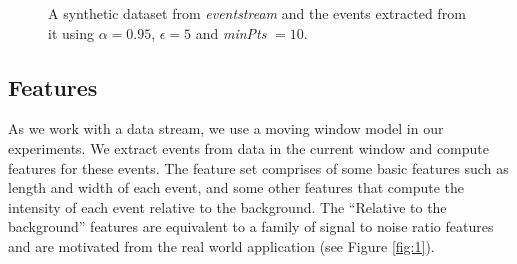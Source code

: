 \documentclass[11pt]{article}
\begin{document}
	 \begin{figure}[H]
	 	\centering
	 	\caption{\footnotesize A synthetic dataset from {\it eventstream} and the events extracted from it using $\alpha=0.95$, $\epsilon = 5$ and {\it minPts} $= 10$.} 
	 	\label{fig:blobs_A_B}
	 \end{figure}
	 
	 \subsection{Features}\label{sec:Featurelist}
	 As we work with a data stream, we use a moving window model in our experiments. We extract events from data in the current window and compute features for these events. The feature set comprises of some basic features such as length and width of each event, and some other features that compute the intensity of each event relative to the background.  The  ``Relative to the background'' features are equivalent to a family of signal to noise ratio features and are motivated from the real world application (see Figure \ref{fig:1}).   
	 
\end{document}
